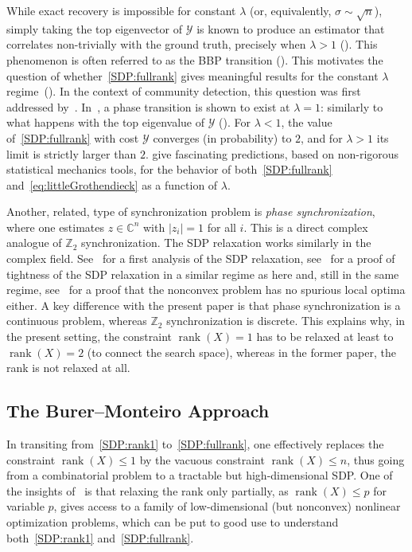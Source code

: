 \documentclass{colt2016} %
\newcommand{\complex}{{\mathbb{C}}}
\newcommand{\rank}{\operatorname{rank}}
\newcommand{\1}{\mathbf{1}}
\newcommand{\ZZ}{\mathbb{Z}}
\newcommand{\YYY}{\mathcal{Y}}
\begin{document}
While exact recovery is impossible for constant $\lambda$ (or, equivalently, $\sigma \sim \sqrt{n}$), simply taking the top eigenvector of $\YYY$ is known to produce an estimator that correlates non-trivially with the ground truth, precisely when $\lambda >1$ (\cite{Feral_Peche_BBPWigner,singer2010angular}). This phenomenon is often referred to as the BBP transition (\cite{BBP_MC_BBP_2005}). This motivates the question of whether~\eqref{SDP:fullrank} gives meaningful results for the constant $\lambda$ regime~(\cite{Montanari_SDPdetectionSBM,javanmard2015phase,Guedon_SBMgrothendieck}). In the context of community detection, this question was first addressed by~\cite{Guedon_SBMgrothendieck}. In~\citep{Montanari_SDPdetectionSBM}, a phase transition is shown to exist at $\lambda=1$: similarly to what happens with the top eigenvalue of $\YYY$ (\cite{Feral_Peche_BBPWigner}). For $\lambda<1$, the value of~\eqref{SDP:fullrank} with cost $\YYY$ converges (in probability) to $2$, and for $\lambda>1$ its limit is strictly larger than $2$. \cite{javanmard2015phase} give fascinating predictions, based on non-rigorous statistical mechanics tools, for the behavior of both~\eqref{SDP:fullrank} and~\eqref{eq:littleGrothendieck} as a function of $\lambda$.

Another, related, type of synchronization problem is \emph{phase synchronization}, where one estimates $z\in\complex^n$ with $|z_i|=1$ for all $i$. This is a direct complex analogue of $\ZZ_2$ synchronization. The SDP relaxation works similarly in the complex field. See~\citep{singer2010angular} for a first analysis of the SDP relaxation, see~\citep{bandeira2014tightness} for a proof of tightness of the SDP relaxation in a similar regime as here and, still in the same regime, see~\citep{boumal2016nonconvexphase} for a proof that the nonconvex problem has no spurious local optima either. A key difference with the present paper is that phase synchronization is a continuous problem, whereas $\ZZ_2$ synchronization is discrete. This explains why, in the present setting, the constraint $\rank(X)=1$ has to be relaxed at least to $\rank(X)=2$ (to connect the search space), whereas in the former paper, the rank is not relaxed at all.

\subsection{The Burer--Monteiro Approach}

In transiting from~\eqref{SDP:rank1} to~\eqref{SDP:fullrank}, one effectively replaces the constraint $\rank(X) \leq 1$ by the vacuous constraint $\rank(X) \leq n$, thus going from a combinatorial problem to a tractable but high-dimensional SDP. One of the insights of~\cite{sdplr,burer2005local} is that relaxing the rank only partially, as $\rank(X)\leq p$ for variable $p$, gives access to a family of low-dimensional (but nonconvex) nonlinear optimization problems, which can be put to good use to understand both~\eqref{SDP:rank1} and~\eqref{SDP:fullrank}.
\end{document}
